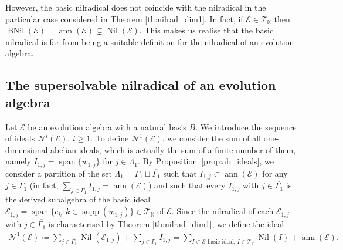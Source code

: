 \documentclass[12pt,reqno]{amsart}
\theoremstyle{definition}
\theoremstyle{remark}
\DeclareMathOperator{\ann}{ann}
\DeclareMathOperator{\spa}{span}
\DeclareMathOperator{\supp}{supp}
\DeclareMathOperator{\nil}{Nil}
\DeclareMathOperator{\bnil}{BNil}
\numberwithin{equation}{section}
\begin{document}
However, the basic nilradical does not coincide with the nilradical in the particular case considered in Theorem \ref{th:nilrad_dim1}. In fact, if $\mathcal{E}\in\mathcal{T}_\mathbb{K}$ then $\bnil(\mathcal{E})=\ann(\mathcal{E})\subsetneq\nil(\mathcal{E})$. This makes us realise that the basic nilradical is far from being a suitable definition for the nilradical of an evolution algebra.

\subsection{The supersolvable nilradical of an evolution algebra}
Let $\mathcal{E}$ be an evolution algebra with a natural basis $B$. We introduce the sequence of ideals $\mathcal{N}^i(\mathcal{E})$, $i\geq1$. To define $\mathcal{N}^1(\mathcal{E})$, we consider the sum of all one-dimensional abelian ideals, which is actually the sum of a finite number of them, namely $I_{1,j}=\spa\{w_{1,j}\}$ for $j\in\varLambda_1$.
By Proposition~\ref{prop:ab_ideals}, we consider a partition of the set $\varLambda_1=\varGamma_1\sqcup\overline{\varGamma_1}$ such that $I_{1,j}\subset\ann(\mathcal{E})$ for any $j\in\varGamma_1$ (in fact, $\sum_{j\in\varGamma_1}I_{1,j}=\ann(\mathcal{E})$) and such that every $I_{1,j}$ with $j\in\overline{\varGamma_1}$ is the derived subalgebra of the basic ideal $\mathcal{E}_{1,j}=\spa\{e_k\colon k\in\supp(w_{1,j})\}\in\mathcal{T}_\mathbb{K}$ of $\mathcal{E}$.
Since the nilradical of each $\mathcal{E}_{1,j}$ with $j\in\overline{\varGamma_1}$ is characterised by Theorem \ref{th:nilrad_dim1}, we define the ideal  
\begin{align}\label{eq:def_n1}
\mathcal{N}^1(\mathcal{E})\coloneqq\sum_{j\in\overline{\varGamma_1}}\nil(\mathcal{E}_{1,j})+\sum_{j\in\varGamma_1}I_{1,j}=\sum_{I\subset\mathcal{E}\text{ basic ideal, }I\in\mathcal{T}_\mathbb{K}}\nil(I)+\ann(\mathcal{E}).
\end{align}
\end{document}
